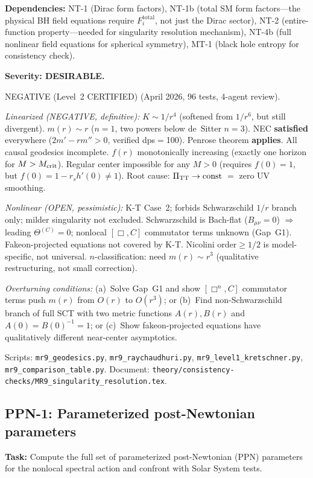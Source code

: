 \documentclass[12pt,a4paper]{article}
\newcommand{\task}[1]{\noindent\textbf{Task:} #1\par}
\newcommand{\deps}[1]{\noindent\textbf{Dependencies:} #1\par}
\begin{document}
\deps{NT-1 (Dirac form factors), NT-1b (total SM form factors---the physical
BH field equations require $F_i^{\text{total}}$, not just the Dirac sector),
NT-2 (entire-function property---needed for singularity resolution mechanism),
NT-4b (full nonlinear field equations for spherical symmetry),
MT-1 (black hole entropy for consistency check).}

\textbf{Severity: DESIRABLE.}

\textcolor{long}{NEGATIVE (Level~2 CERTIFIED)} (April 2026, 96 tests, 4-agent review).

\emph{Linearized (NEGATIVE, definitive):}
$K \sim 1/r^4$ (softened from $1/r^6$, but still divergent).
$m(r) \sim r$ ($n=1$, two powers below de~Sitter $n=3$).
NEC \textbf{satisfied} everywhere ($2m'-rm''>0$, verified dps$=$100).
Penrose theorem \textbf{applies}. All causal geodesics incomplete.
$f(r)$ monotonically increasing (exactly one horizon for $M>M_{\rm crit}$).
Regular center impossible for any $M>0$ (requires $f(0)=1$, but $f(0)=1-r_s h'(0)\ne 1$).
Root cause: $\Pi_{\rm TT}\to\mathrm{const}$ $=$ zero UV smoothing.

\emph{Nonlinear (OPEN, pessimistic):}
K-T Case~2; forbids Schwarzschild $1/r$ branch only; milder singularity not excluded.
Schwarzschild is Bach-flat ($B_{\mu\nu}=0$) $\Rightarrow$ leading $\Theta^{(C)}=0$;
nonlocal $[\Box,C]$ commutator terms unknown (Gap~G1).
Fakeon-projected equations not covered by K-T.
Nicolini order${\ge}1/2$ is model-specific, not universal.
$n$-classification: need $m(r)\sim r^3$ (qualitative restructuring, not small correction).

\emph{Overturning conditions:}
(a)~Solve Gap~G1 and show $[\Box^n,C]$ commutator terms push $m(r)$ from $O(r)$ to $O(r^3)$; or
(b)~Find non-Schwarzschild branch of full SCT with two metric functions $A(r),B(r)$
  and $A(0)=B(0)^{-1}=1$; or
(c)~Show fakeon-projected equations have qualitatively different near-center asymptotics.

Scripts: \texttt{mr9\_geodesics.py}, \texttt{mr9\_raychaudhuri.py},
\texttt{mr9\_level1\_kretschner.py}, \texttt{mr9\_comparison\_table.py}.
Document: \texttt{theory/consistency-checks/MR9\_singularity\_resolution.tex}.

\subsection{PPN-1: Parameterized post-Newtonian parameters}
\label{task:PPN1}

\task{Compute the full set of parameterized post-Newtonian (PPN) parameters
for the nonlocal spectral action and confront with Solar System tests.}
\end{document}
